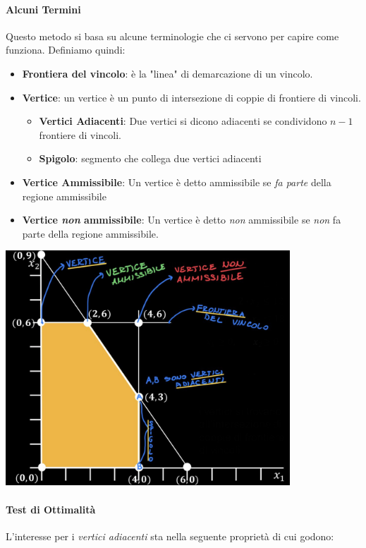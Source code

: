 \documentclass[12pt, a4paper, openany]{book}
\begin{document}
\paragraph*{Alcuni Termini}
Questo metodo si basa su alcune terminologie che ci servono per capire come funziona.
Definiamo quindi:
\begin{itemize}
    \item \textbf{Frontiera del vincolo}: è la "linea" di demarcazione di un vincolo.
    \item \textbf{Vertice}: un vertice è un punto di intersezione di coppie di frontiere di vincoli.
    \begin{itemize}
        \item \textbf{Vertici Adiacenti}: Due vertici si dicono adiacenti se condividono $n-1$ frontiere di vincoli.
        \item \textbf{Spigolo}: segmento che collega due vertici adiacenti
    \end{itemize}
    \item \textbf{Vertice Ammissibile}: Un vertice è detto ammissibile se \emph{fa parte} della regione ammissibile
    \item \textbf{Vertice \emph{non} ammissibile}: Un vertice è detto \emph{non} ammissibile se \emph{non} fa parte della regione ammissibile.
\end{itemize}
\begin{center}
    \includegraphics[width=0.8\textwidth]{img/Simplesso1.jpg}
\end{center}
\paragraph*{Test di Ottimalità}
L'interesse per i \emph{vertici adiacenti} sta nella seguente proprietà di cui godono:
\end{document}
